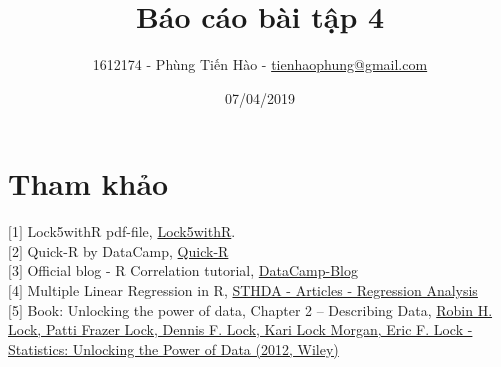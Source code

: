 \documentclass[a4paper,12pt]{article}
\title{Báo cáo bài tập 4}
\author{1612174 - Phùng Tiến Hào - \href{mailto:tienhaophung@gmail.com}{tienhaophung@gmail.com}}
\date{07/04/2019}
\begin{document}
	\maketitle
	\newpage
	
	\doublespacing
	\tableofcontents
	\singlespace
	
	\newpage
	
	\section{Tham khảo}
	\label{Tham khao}
	$\lbrack$1$\rbrack$ Lock5withR pdf-file, \href{https://drive.google.com/open?id=1YQN6KA6lvsPVCqWU-4CQJkcxd7248TqD}{Lock5withR}.\\	
	$\lbrack$2$\rbrack$ Quick-R by DataCamp, \href{https://www.statmethods.net/stats/descriptives.html}{Quick-R}\\	
	$\lbrack$3$\rbrack$ Official blog - R Correlation tutorial, \href{https://www.datacamp.com/community/blog/r-correlation-tutorial}{DataCamp-Blog}\\
	$\lbrack$4$\rbrack$ Multiple Linear Regression in R, \href{http://www.sthda.com/english/articles/40-regression-analysis/168-multiple-linear-regression-in-r/}{STHDA - Articles - Regression Analysis}\\
	$\lbrack$5$\rbrack$ Book: Unlocking the power of data, Chapter 2 – Describing Data, \href{https://drive.google.com/open?id=1ilCQevunVvqr4X8OeWca2aswWOwm-YBg}{Robin H. Lock, Patti Frazer Lock, Dennis F. Lock, Kari Lock Morgan, Eric F. Lock - Statistics: Unlocking the Power of Data (2012, Wiley)}
	
\end{document}

